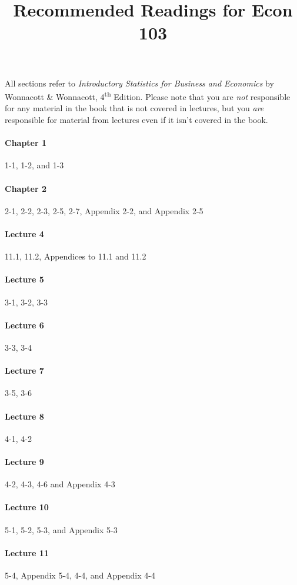 \documentclass[12pt]{article}
\title{Recommended Readings for Econ 103}
\author{}
\date{}
\begin{document}
\maketitle

\noindent All sections refer to \emph{Introductory Statistics for Business and Economics} by Wonnacott \& Wonnacott, 4\textsuperscript{th} Edition.
Please note that you are \emph{not} responsible for any material in the book that is not covered in lectures, but you \emph{are} responsible for material from lectures even if it isn't covered in the book.

\paragraph{Chapter 1} 1-1, 1-2, and 1-3
\paragraph{Chapter 2} 2-1, 2-2, 2-3, 2-5, 2-7, Appendix 2-2, and Appendix 2-5
\paragraph{Lecture 4} 11.1, 11.2, Appendices to 11.1 and 11.2
\paragraph{Lecture 5} 3-1, 3-2, 3-3
\paragraph{Lecture 6} 3-3, 3-4
\paragraph{Lecture 7} 3-5, 3-6 
\paragraph{Lecture 8} 4-1, 4-2
\paragraph{Lecture 9} 4-2, 4-3, 4-6 and Appendix 4-3
\paragraph{Lecture 10} 5-1, 5-2, 5-3, and Appendix 5-3
\paragraph{Lecture 11} 5-4, Appendix 5-4, 4-4, and Appendix 4-4
\end{document}
